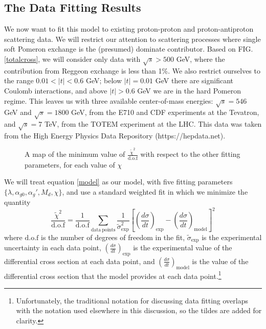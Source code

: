 \documentclass[aps, prd, preprintnumbers, floatfix, showpacs, showkeys, nofootinbib, 10pt]{revtex4-1}
\def\beq{\begin{equation}}
\def\eeq{\end{equation}}
\begin{document}
\subsection{The Data Fitting Results}

We now want to fit this model to existing proton-proton and proton-antiproton scattering data.  We will restrict our attention to scattering processes where single soft Pomeron exchange is the (presumed) dominate contributor.  Based on FIG. \ref{totalcross}, we will consider only data with $\sqrt{s} > 500$ GeV, where the contribution from Reggeon exchange is less than 1\%.  We also restrict ourselves to the range $0.01 < |t| < 0.6$ GeV; below $|t| = 0.01$ GeV there are significant Coulomb interactions, and above $|t| > 0.6$ GeV we are in the hard Pomeron regime.  This leaves us with three available center-of-mass energies: $\sqrt{s} = 546$ GeV and $\sqrt{s} = 1800$ GeV, from the E710 and CDF experiments at the Tevatron, and $\sqrt{s} = 7$ TeV, from the TOTEM experiment at the LHC.  This data was taken from the High Energy Physics Data Repository (https://hepdata.net).

\begin{figure}
\begin{center}
\caption{\label{xivschi} A map of the minimum value of $\frac{\tilde{\chi}^2}{\mathrm{d.o.f}}$ with respect to the other fitting parameters, for each value of $\chi$}
\end{center}
\end{figure}

We will treat equation \ref{model} as our model, with five fitting parameters $\{\lambda, \alpha_{g0}, \alpha_{g}', M_d, \chi\}$, and use a standard weighted fit in which we minimize the quantity
\beq
\frac{\tilde{\chi}^2}{\mathrm{d.o.f}} = \frac{1}{\mathrm{d.o.f}}\sum_{\mathrm{data \ points}} \frac{1}{\tilde{\sigma}^2_{\mathrm{exp}}}\left[\left(\frac{d\sigma}{dt}\right)_{\mathrm{exp}} - \left(\frac{d\sigma}{dt}\right)_{\mathrm{model}}\right]^2
\eeq
where $\mathrm{d.o.f}$ is the number of degrees of freedom in the fit, $\tilde{\sigma}_{\mathrm{exp}}$ is the experimental uncertainty in each data point, $\left(\frac{d\sigma}{dt}\right)_{\mathrm{exp}}$ is the experimental value of the differential cross section at each data point, and $\left(\frac{d\sigma}{dt}\right)_{\mathrm{model}}$ is the value of the differential cross section that the model provides at each data point.\footnote{Unfortunately, the traditional notation for discussing data fitting overlaps with the notation used elsewhere in this discussion, so the tildes are added for clarity.}  
\end{document}
